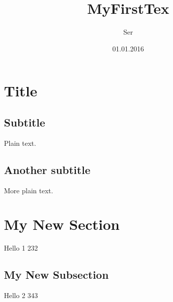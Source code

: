 \documentclass{article}
\begin{document}
\title{MyFirstTex}
\author{Ser}
\date{01.01.2016}
\maketitle

\section{Title}

\subsection{Subtitle}

Plain text.

\subsection{Another subtitle}

More plain text.

\section{My New Section}
Hello 1 232
\subsection{My New Subsection}
Hello 2 343 %
\end{document}
